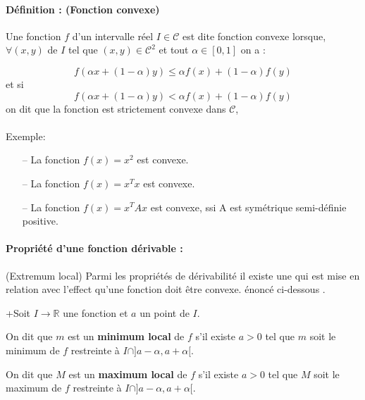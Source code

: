 		\paragraph*{Définition : (Fonction convexe)}
		Une fonction $f$ d'un intervalle réel $I \in \mathcal{C}$ est dite fonction convexe lorsque, $\forall (x,y)$ de $I$ tel que $(x,y) \in \mathcal{C}^2$ et tout $\alpha \in [0, 1]$  on a :
		
				
		\begin{equation}
			f(\alpha x + (1 - \alpha)y) \leq \alpha f(x) + (1 - \alpha)f(y)
			\label{eq_convexe-1}
		\end{equation}
		et si
		\begin{equation}
			f(\alpha x + (1 - \alpha)y) < \alpha f(x) + (1 - \alpha)f(y)
			\label{eq_convexe-2}
		\end{equation}
		on dit que la fonction est strictement convexe dans $\mathcal{C}$,  \cite{jtshiman:2021}\\\\
		Exemple: 
		\begin{itemize}
			\item[--] La fonction $ f(x) = x^2$ est convexe. 
			\item[--] La fonction $ f(x) = x^T x$ est convexe.
			\item[--] La fonction $ f(x) = x^T Ax$ est convexe, ssi A est symétrique semi-définie positive.
		\end{itemize}
	
		\paragraph*{Propriété d'une fonction dérivable : } (Extremum local) 
		Parmi les propriétés de dérivabilité il existe une qui est mise en relation avec l'effect qu'une fonction doit être convexe. énoncé ci-dessous \cite[][p. 212]{coulombeau2013math}.\\
		\begin{list}{+}{Soit $I \rightarrow  \mathbb{R} $ une fonction et $a$ un point de $I$.}
			\item  {On dit que $m$ est un \textbf{minimum local} de $f$ s'il existe $a > 0$ tel que $m$ soit le minimum de $f$ restreinte à $I \cap ] a-\alpha, a + \alpha [$. }
			\item On dit que $M$ est un \textbf{maximum local} de $f$ s'il existe $a > 0$ tel que $M$ soit le maximum de $f$ restreinte à $I \cap ] a-\alpha, a + \alpha [$. 
		\end{list} 
		
